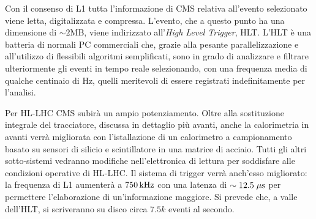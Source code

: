 Con il consenso di L1 tutta l'informazione di CMS relativa all'evento selezionato viene letta, digitalizzata e compressa. L'evento, che a questo punto ha una dimensione di $\sim2$MB, viene indirizzato all'{\em High Level Trigger}, HLT\cite{Adam:2005zf}. L'HLT \`e una batteria di normali PC commerciali che, grazie alla pesante parallelizzazione e all'utilizzo di flessibili algoritmi semplificati, sono in grado di analizzare e filtrare ulteriormente gli eventi in tempo reale selezionando, con una frequenza media di qualche centinaio di Hz, quelli meritevoli di essere registrati indefinitamente per l'analisi.

Per HL-LHC CMS subir\`a un ampio potenziamento. Oltre alla sostituzione integrale del tracciatore, discussa in dettaglio pi\`u avanti, anche la calorimetria in avanti verr\`a migliorata con l'istallazione di un calorimetro a campionamento basato su sensori di silicio e scintillatore in una matrice di acciaio. Tutti gli altri sotto-sistemi vedranno modifiche nell'elettronica di lettura per soddisfare alle condizioni operative di HL-LHC. Il sistema di trigger verr\`a anch'esso migliorato: la frequenza di L1 aumenter\`a a $750{\rm \, kHz}$ con una latenza di $\sim 12.5\; \mu \rm s$ per permettere l'elaborazione di un'informazione maggiore. Si prevede che, a valle dell'HLT, si scriveranno su disco circa $7.5k$ eventi al secondo.





